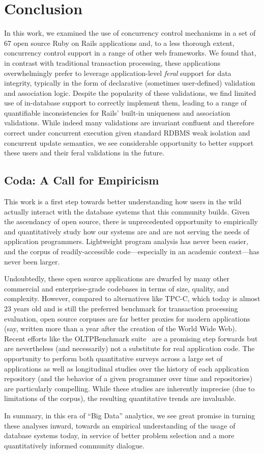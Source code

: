 
\section{Conclusion}
\label{sec:conclusion}

In this work, we examined the use of concurrency control mechanisms in
a set of 67 open source Ruby on Rails applications and, to a less
thorough extent, concurrency control support in a range of other web
frameworks. We found that, in contrast with traditional transaction
processing, these applications overwhelmingly prefer to leverage
application-level \textit{feral} support for data integrity, typically
in the form of declarative (sometimes user-defined) validation and
association logic. Despite the popularity of these validations, we
find limited use of in-database support to correctly implement them,
leading to a range of quantifiable inconsistencies for Rails' built-in
uniqueness and association validations. While indeed many validations
are invariant confluent and therefore correct under concurrent
execution given standard RDBMS weak isolation and concurrent update
semantics, we see considerable opportunity to better support these
users and their feral validations in the future.


\subsection*{Coda: A Call for Empiricism}

This work is a first step towards better understanding how users in
the wild actually interact with the database systems that this
community builds. Given the ascendancy of open source, there is
unprecedented opportunity to empirically and quantitatively study how
our systems are and are not serving the needs of application
programmers. Lightweight program analysis has never been easier, and
the corpus of readily-accessible code---especially in an academic
context---has never been larger.

Undoubtedly, these open source applications are dwarfed by many other
commercial and enterprise-grade codebases in terms of size, quality,
and complexity. However, compared to alternatives like TPC-C, which
today is almost 23 years old and is still the preferred benchmark for
transaction processing evaluation, open source corpuses are far better
proxies for modern applications (say, written more than a year after
the creation of the World Wide Web). Recent efforts like the
OLTPBenchmark suite~\cite{oltpbench} are a promising step forwards but
are nevertheless (and necessarily) not a substitute for real
application code. The opportunity to perform both quantitative surveys
across a large set of applications as well as longitudinal studies
over the history of each application repository (and the behavior of a
given programmer over time and repositories) are particularly
compelling. While these studies are inherently imprecise (due to
limitations of the corpus), the resulting quantitative trends are
invaluable.

In summary, in this era of ``Big Data'' analytics, we see great
promise in turning these analyses inward, towards an empirical
understanding of the usage of database systems today, in service of
better problem selection and a more quantitatively informed community
dialogue.

